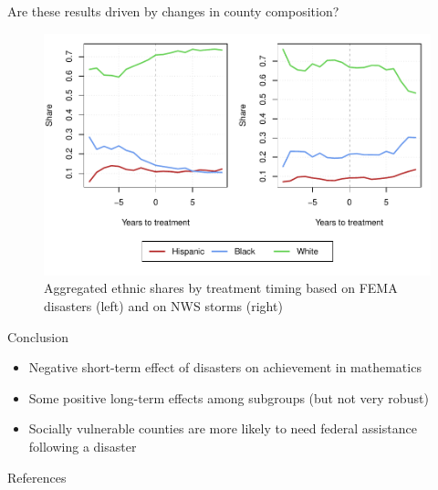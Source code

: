 \documentclass[hyperref={colorlinks = true,linkcolor = blue, citecolor=blue,urlcolor=blue}]{beamer}
\begin{document}
\begin{frame}{Are these results driven by changes in county composition?}
	
	\begin{figure}[!h]
		\centering
		\includegraphics[scale=0.6]{"../Code & Data/EthnicComposition.pdf"}
		\caption{Aggregated ethnic shares by treatment timing based on FEMA disasters (left) and on NWS storms (right)}
		\label{EthnicComposition}
	\end{figure}
\end{frame}


\begin{frame}{Conclusion}
	\begin{itemize}
		\item Negative short-term effect of disasters on achievement in mathematics
		\item Some positive long-term effects among subgroups (but not very robust)
		\item Socially vulnerable counties are more likely to need federal assistance following a disaster
	\end{itemize}
\end{frame}



\begin{frame}{References}
	
	
\end{frame}
\end{document}
